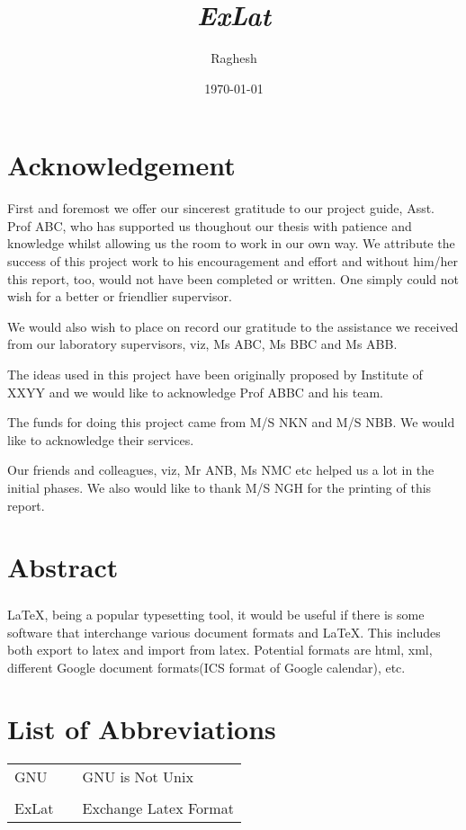 \documentclass[a4paper,10pt]{mesreport}
\title{\emph{ExLat}}
\author{{Raghesh}}
\date{\today}
\begin{document}
\maketitle

\chapter*{Acknowledgement}
\thispagestyle{empty}
First and foremost we offer our sincerest gratitude to our project guide,
Asst. Prof ABC, who has supported us thoughout our thesis with patience
and knowledge whilst allowing us the room to work in our own way. We attribute
the success of this project work to his encouragement and effort and without
him/her this report, too, would not have been completed or written. One simply
could not wish for a better or friendlier supervisor. 

We would also wish to place on record our gratitude to the assistance we
received from our laboratory supervisors, viz, Ms ABC, Ms BBC and Ms ABB.

The ideas used in this project have been originally proposed by Institute
of XXYY and we would like to acknowledge Prof ABBC and his team. 

The funds for doing this project came from M/S NKN and M/S NBB. We would
like to acknowledge their services.

Our friends and colleagues, viz, Mr ANB, Ms NMC etc helped us a lot in the
initial phases. We also would like to thank M/S NGH for the printing of this report.
\chapter*{Abstract}
\paragraph{}

LaTeX, being a popular typesetting tool, it would be useful if there is some software that interchange
various document formats and LaTeX. This includes both export to latex and import from latex.
Potential formats are html, xml, different Google document formats(ICS format of Google calendar), etc.

\tableofcontents
\listoffigures
\chapter*{List of Abbreviations}

\begin{tabular}{ l l  l } 

GNU &  &GNU is Not Unix\\
\\
ExLat &  &Exchange Latex Format

\end{tabular} 
\end{document}
